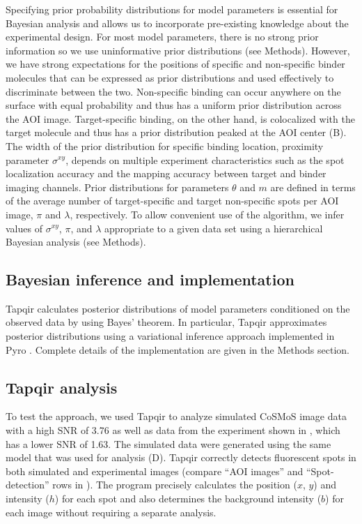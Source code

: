 Specifying prior probability distributions for model parameters is essential for Bayesian analysis and allows us to incorporate pre-existing knowledge about the experimental design. For most model parameters, there is no strong prior information so we use uninformative prior distributions (see Methods). However, we have strong expectations for the positions of specific and non-specific binder molecules that can be expressed as prior distributions and used effectively to discriminate between the two. Non-specific binding can occur anywhere on the surface with equal probability and thus has a uniform prior distribution across the AOI image. Target-specific binding, on the other hand, is colocalized with the target molecule and thus has a prior distribution peaked at the AOI center (B). The width of the prior distribution for specific binding location, proximity parameter $\sigma^{xy}$, depends on multiple experiment characteristics such as the spot localization accuracy and the mapping accuracy between target and binder imaging channels. Prior distributions for parameters $\theta$ and $m$ are defined in terms of the average number of target-specific and target non-specific spots per AOI image, $\pi$ and $\lambda$, respectively. To allow convenient use of the algorithm, we infer values of $\sigma^{xy}$, $\pi$, and $\lambda$ appropriate to a given data set using a hierarchical Bayesian analysis (see Methods).



\subsection{Bayesian inference and implementation}

Tapqir calculates posterior distributions of model parameters conditioned on the observed data by using Bayes' theorem. In particular, Tapqir approximates posterior distributions using a variational inference approach implemented in Pyro \citep{Bingham2019-qy}.  Complete details of the implementation are given in the Methods section.

\subsection{Tapqir analysis}

To test the approach, we used Tapqir to analyze simulated CoSMoS image data with a high SNR of 3.76 as well as data from the experiment shown in , which has a lower SNR of 1.63. The simulated data were generated using the same model that was used for analysis (D). Tapqir correctly detects fluorescent spots in both simulated and experimental images (compare ``AOI images'' and ``Spot-detection'' rows in ). The program precisely calculates the position ($x$, $y$) and intensity ($h$) for each spot and also determines the background intensity ($b$) for each image without requiring a separate analysis. 

